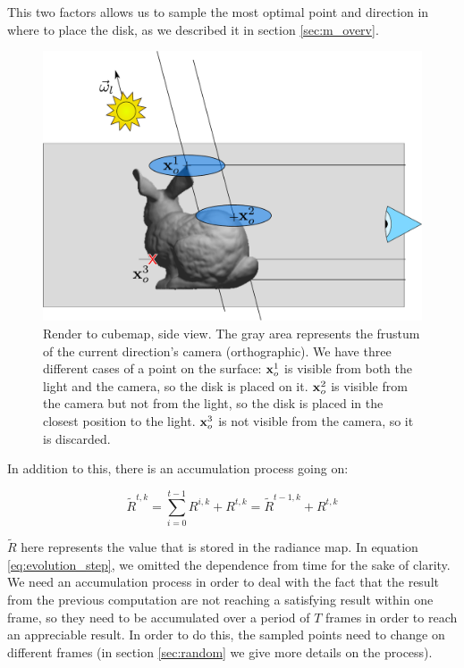 This two factors allows us to sample the most optimal point and direction in where to place the disk, as we described it in section \ref{sec:m_overv}.
 
\begin{figure}[!ht]
\centering
\includegraphics[width=\linewidth]{images/method/step2}
\caption{Render to cubemap, side view. The gray area represents the frustum of the current direction's camera (orthographic). We have three different cases of a point on the surface: $\mathbf{x}_o^1$ is visible from both the light and the camera, so the disk is placed on it. $\mathbf{x}_o^2$ is visible from the camera but not from the light, so the disk is placed in the closest position to the light. $\mathbf{x}_o^3$ is not visible from the camera, so it is discarded.}
\label{fig:stepfrustum}
\end{figure} 

In addition to this, there is an accumulation process going on:

$$
\tilde{R}^{t,k} = \sum_{i = 0}^{t-1} R^{i,k} + R^{t,k} = \tilde{R}^{t-1, k} + R^{t,k}
$$

$\tilde{R}$ here represents the value that is stored in the radiance map. In equation \ref{eq:evolution_step}, we omitted the dependence from time for the sake of clarity. We need an accumulation process in order to deal with the fact that the result from the previous computation are not reaching a satisfying result within one frame, so they need to be accumulated over a period of $T$ frames in order to reach an appreciable result. In order to do this, the sampled points need to change on different frames (in section \ref{sec:random} we give more details on the process). 

